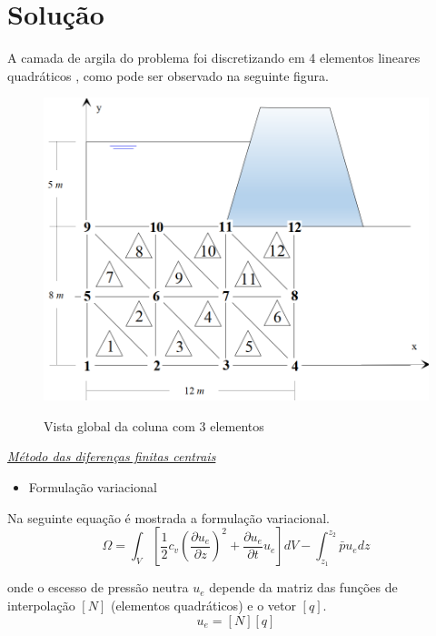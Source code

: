 \documentclass{article} %
\begin{document}
\newpage

\section*{Solução}

\vspace{10mm}



A camada de argila do problema foi discretizando em 4 elementos lineares quadráticos , como pode ser observado na seguinte figura.

\begin{figure}[H]
	\centering
	\caption{Vista global da coluna com 3 elementos}	\includegraphics[width=1\linewidth]{elemento}	
	\label{elemento}	
\end{figure}

\underline{\large \textit{Método das diferenças finitas centrais}}\\


\begin{itemize}
	\item Formulação variacional	
\end{itemize}

Na seguinte equação  é mostrada a formulação variacional.
\begin{equation}
\Omega=\int_{V}\left[\frac{1}{2}c_v\left(\frac{\partial u_e}{\partial z}\right)^2+\frac{\partial u_e}{\partial t}u_e\right]dV-\int_{z_1}^{z_2}\bar{p}u_edz
\end{equation}

onde o escesso de pressão neutra \(u_e\) depende da matriz das funções de interpolação \([N]\) (elementos quadráticos) e o vetor \([q]\).
\begin{equation}
u_e=[N][q]
\end{equation}
\end{document}
